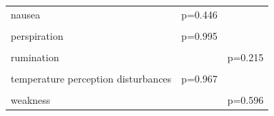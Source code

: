 \begin{table}[!h]
{\begin{tabular}[t]{lll}
nausea & p=0.446 & \\
\cellcolor{gray!10}{paresthesia} & \cellcolor{gray!10}{p=0.995} & \cellcolor{gray!10}{}\\
\addlinespace
perspiration & p=0.995 & \\
\cellcolor{gray!10}{pseudohallucination} & \cellcolor{gray!10}{p=0.995} & \cellcolor{gray!10}{}\\
rumination &  & p=0.215\\
\cellcolor{gray!10}{sleep disorder} & \cellcolor{gray!10}{} & \cellcolor{gray!10}{p=0.555}\\
temperature perception disturbances & p=0.967 & \\
\addlinespace
\cellcolor{gray!10}{thinking abnormal} & \cellcolor{gray!10}{p=0.978} & \cellcolor{gray!10}{}\\
weakness &  & p=0.596\\
\bottomrule
\end{tabular}}
\end{table}
